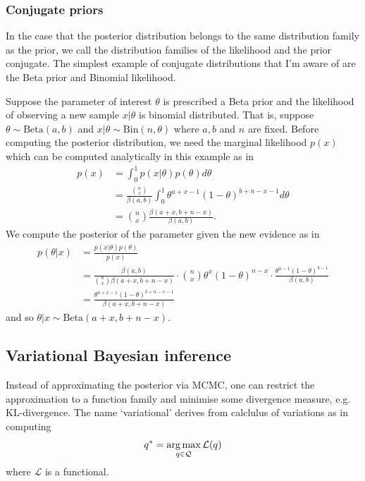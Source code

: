 \documentclass[11pt]{article}
\begin{document}
\begin{appendices}
\subsubsection{Conjugate priors}
In the case that the posterior distribution belongs to the same distribution family as the prior, we call the distribution families of the likelihood and the prior conjugate. The simplest example of conjugate distributions that I'm aware of are the Beta prior and Binomial likelihood.
\begin{example}
    Suppose the parameter of interest $\theta$ is prescribed a Beta prior and the likelihood of observing a new sample $x|\theta$ is binomial distributed. That is, suppose $\theta\sim\text{Beta}(a,b)$ and $x|\theta\sim\text{Bin}(n,\theta)$ where $a, b$ and $n$ are fixed. Before computing the posterior distribution, we need the marginal likelihood $p(x)$ which can be computed analytically in this example as in
    \begin{align*}
        p(x)
        &=
        \int_0^1 p(x|\theta)p(\theta)d\theta\\
        &=
        \frac{\binom{n}{x}}{\beta(a,b)}\int_0^1\theta^{a+x-1}(1-\theta)^{b+n-x-1}d\theta\\
        &=
        \binom{n}{x}\frac{\beta(a+x,b+n-x)}{\beta(a,b)}.
    \end{align*}
    We compute the posterior of the parameter given the new evidence as in
    \begin{align*}
        p(\theta|x)
        &=
        \frac{p(x|\theta)p(\theta)}{p(x)}\\
        &=
        \frac{\beta(a,b)}{\binom{n}{x}\beta(a+x,b+n-x)}\cdot\binom{n}{x}\theta^x(1-\theta)^{n-x}\cdot\frac{\theta^{a-1}(1-\theta)^{b-1}}{\beta(a,b)}\\
        &=
        \frac{\theta^{a+x-1}(1-\theta)^{b+n-x-1}}{\beta(a+x,b+n-x)}
    \end{align*}
    and so $\theta|x\sim\text{Beta}(a+x,b+n-x)$.
\end{example}

\subsection{Variational Bayesian inference}
Instead of approximating the posterior via MCMC, one can restrict the approximation to a function family and minimise some divergence measure, e.g. KL-divergence. The name `variational' derives from calclulus of variations as in computing
$$
q^*
=
\operatorname*{arg\,max}_{q\in\mathcal{Q}}\mathcal{L}(q)
$$
where $\mathcal{L}$ is a functional.


\end{appendices}
\end{document}
